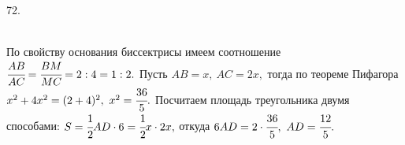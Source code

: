 72. \begin{figure}[ht!]
\end{figure}\\
По свойству основания биссектрисы имеем соотношение $\cfrac{AB}{AC}=\cfrac{BM}{MC}=2:4=1:2.$ Пусть $AB=x,\ AC=2x,$ тогда по теореме Пифагора $x^2+4x^2=(2+4)^2,\ x^2=\cfrac{36}{5}.$ Посчитаем площадь треугольника двумя способами: $S=\cfrac{1}{2}AD\cdot6=\cfrac{1}{2}x\cdot2x,$ откуда $6AD=2\cdot\cfrac{36}{5},\ AD=\cfrac{12}{5}.$\\
